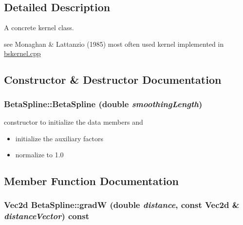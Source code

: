 \subsection{Detailed Description}
A concrete kernel class. 

see Monaghan \& Lattanzio (1985) most often used kernel implemented in \hyperlink{bskernel_8cpp}{bskernel.cpp} 

\subsection{Constructor \& Destructor Documentation}
\hypertarget{classBetaSpline_00e744e584e6e7291813ab5e59d801ec}{
\subsubsection[{BetaSpline}]{\setlength{\rightskip}{0pt plus 5cm}BetaSpline::BetaSpline (double {\em smoothingLength})}}
\label{classBetaSpline_00e744e584e6e7291813ab5e59d801ec}


constructor to initialize the data members and 



\begin{itemize}
\item initialize the auxiliary factors\end{itemize}


\begin{itemize}
\item normalize to 1.0 \end{itemize}


\subsection{Member Function Documentation}
\hypertarget{classBetaSpline_409d22f7b4165a612ffbb62400e55db7}{
\subsubsection[{gradW}]{\setlength{\rightskip}{0pt plus 5cm}Vec2d BetaSpline::gradW (double {\em distance}, \/  const Vec2d \& {\em distanceVector}) const}}
\label{classBetaSpline_409d22f7b4165a612ffbb62400e55db7}


